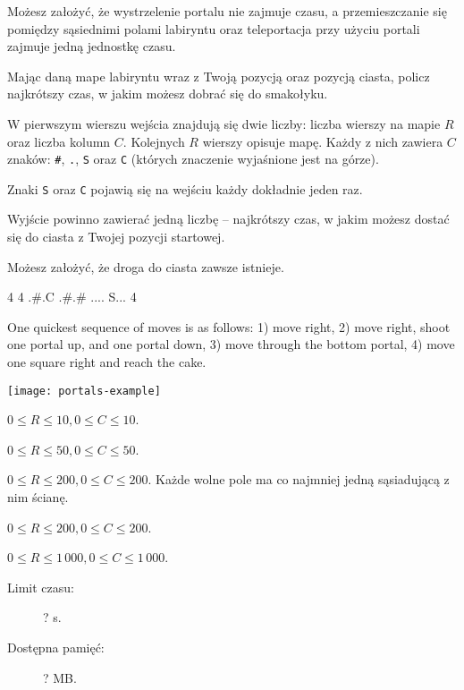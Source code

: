 \documentclass{boi2014-pl}
\newcommand{\constant}[1]{{\tt #1}}
\begin{document}
    Możesz założyć, że wystrzelenie portalu nie zajmuje czasu, a przemieszczanie się pomiędzy sąsiednimi polami labiryntu oraz teleportacja przy użyciu portali zajmuje jedną jednostkę czasu.

    \Task
    Mając daną mape labiryntu wraz z Twoją pozycją oraz pozycją ciasta, policz najkrótszy czas, w jakim możesz dobrać się do smakołyku.

    \Input
    W pierwszym wierszu wejścia znajdują się dwie liczby: liczba wierszy na mapie $R$ oraz liczba kolumn $C$.
    Kolejnych $R$ wierszy opisuje mapę.
    Każdy z nich zawiera $C$ znaków: \constant{\#}, \constant{.}, \constant{S} oraz \constant{C} (których znaczenie wyjaśnione jest na górze).

    Znaki \constant{S} oraz \constant{C} pojawią się na wejściu każdy dokładnie jeden raz.

    \Output
    Wyjście powinno zawierać jedną liczbę -- najkrótszy czas, w jakim możesz dostać się do ciasta z Twojej pozycji startowej.

    Możesz założyć, że droga do ciasta zawsze istnieje.

    \Example
    \example
    {
        4 4\newline
        .\#.C\newline
        .\#.\#\newline
        ....\newline
        S...
    }
    {
        4
    }
    {
        One quickest sequence of moves is as follows: 1) move right, 2) move
        right, shoot one portal up, and one portal down, 3) move through the
        bottom portal, 4) move one square right and reach the cake.

        \begin{center}
            \texttt{[image: portals-example]}
        \end{center}
    }

    \Scoring

    \begin{description}[leftmargin=0pt]
        \item[Podzadanie 1 (? punktów):] $0 \le R \le 10, 0 \le C \le 10$.
        \item[Podzadanie 2 (? punktów):] $0 \le R \le 50, 0 \le C \le 50$.
        \item[Podzadanie 3 (? punktów):] $0 \le R \le 200, 0 \le C \le 200$.
        Każde wolne pole ma co najmniej jedną sąsiadującą z nim ścianę.
        \item[Podzadanie 4 (? punktów):] $0 \le R \le 200, 0 \le C \le 200$.
        \item[Podzadanie 5 (? punktów):] $0 \le R \le 1\,000, 0 \le C \le 1\,000$.
    \end{description}

    \Constraints

    \begin{description}
        \item[Limit czasu:] ? s.
        \item[Dostępna pamięć:] ? MB.
    \end{description}
\end{document}

